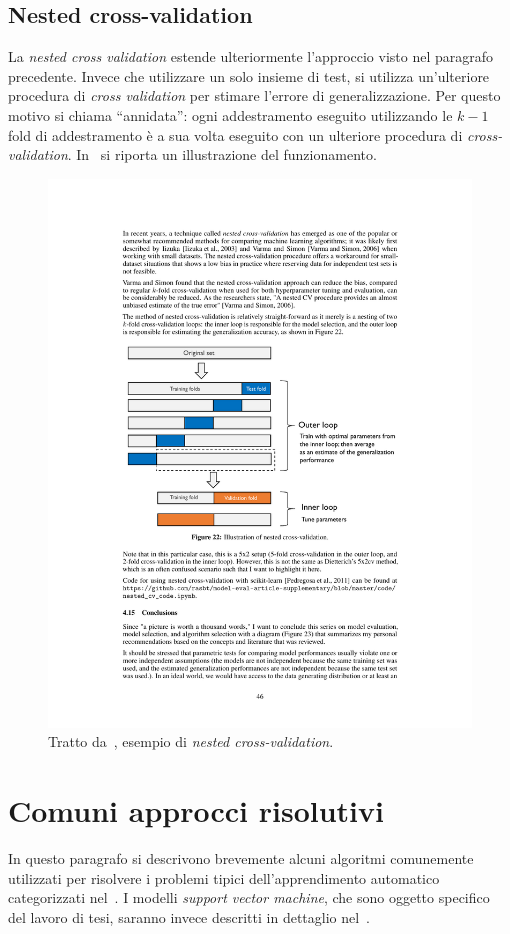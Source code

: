 \subsection{Nested cross-validation}
La \emph{nested cross validation} estende ulteriormente l'approccio visto nel paragrafo precedente.
Invece che utilizzare un solo insieme di test, si utilizza un'ulteriore procedura di \emph{cross validation} per stimare l'errore di generalizzazione.
Per questo motivo si chiama ``annidata'': ogni addestramento eseguito utilizzando le $k-1$ fold di addestramento è a sua volta eseguito con un ulteriore procedura di \emph{cross-validation}.
In~ si riporta un illustrazione del funzionamento.
\begin{figure}
    \centering
    \includegraphics[width=0.8\linewidth]{img/nested_cv.pdf}
    \caption{Tratto da~\cite{model_evaluation}, esempio di \emph{nested cross-validation}.}
    \label{fig:nested_cv}
\end{figure}

\section{Comuni approcci risolutivi}\label{sec:comuni_approcci_risolutivi}
In questo paragrafo si descrivono brevemente alcuni algoritmi comunemente utilizzati per risolvere i problemi tipici dell'apprendimento automatico categorizzati nel~.
I modelli \emph{support vector machine}, che sono oggetto specifico del lavoro di tesi, saranno invece descritti in dettaglio nel~.

